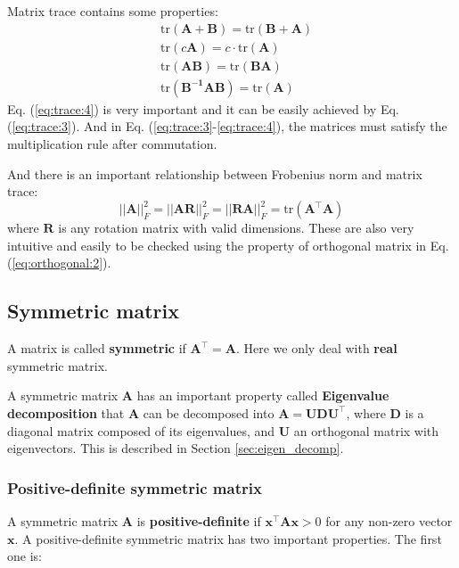 \documentclass[12pt]{article}
\numberwithin{equation}{section}
\begin{document}
Matrix trace contains some properties:
\begin{align}
& \text{tr}(\mathbf{A + B}) = \text{tr}(\mathbf{B + A}) \label{eq:trace:1} \\
& \text{tr}(c\mathbf{A}) = c\cdot \text{tr}(\mathbf{A}) \label{eq:trace:2} \\
& \text{tr}(\mathbf{AB}) = \text{tr}(\mathbf{BA}) \label{eq:trace:3} \\
& \text{tr}(\mathbf{B^{-1}AB}) = \text{tr}(\mathbf{A}) \label{eq:trace:4}
\end{align}
Eq. (\ref{eq:trace:4}) is very important and it can be easily achieved by Eq. (\ref{eq:trace:3}). And in Eq. (\ref{eq:trace:3}-\ref{eq:trace:4}), the matrices must satisfy the multiplication rule after commutation.

And there is an important relationship between Frobenius norm and matrix trace:
\begin{equation}
||\mathbf{A}||_F^2 = ||\mathbf{AR}||_F^2 =||\mathbf{RA}||_F^2 = \text{tr}(\mathbf{A^\top A})
\label{eq:trace}
\end{equation}
where $\mathbf{R}$ is any rotation matrix with valid dimensions. These are also very intuitive and easily to be checked using the property of orthogonal matrix in Eq. (\ref{eq:orthogonal:2}).

\subsection{Symmetric matrix}

A matrix is called \textbf{symmetric} if $\mathbf{A}^\top = \mathbf{A}$. Here we only deal with \textbf{real} symmetric matrix. 

A symmetric matrix $\mathbf{A}$ has an important property called \textbf{Eigenvalue decomposition} that $\mathbf{A}$ can be decomposed into $\mathbf{A = UDU^\top}$, where $\mathbf{D}$ is a diagonal matrix composed of its eigenvalues, and $\mathbf{U}$ an orthogonal matrix with eigenvectors. This is described in Section \ref{sec:eigen_decomp}.

\subsubsection{Positive-definite symmetric matrix}

A symmetric matrix $\mathbf{A}$ is \textbf{positive-definite} if $\mathbf{x}^\top \mathbf{A}\mathbf{x} > 0$ for any non-zero vector $\mathbf{x}$. A positive-definite symmetric matrix has two important properties. The first one is: \newline
\end{document}
